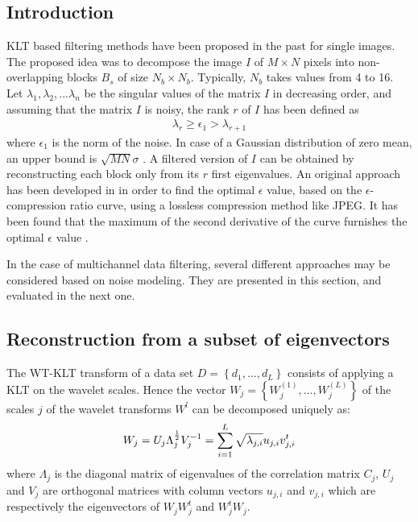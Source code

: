\subsection{Introduction}
KLT based filtering methods have been proposed 
in the past \cite{mc:andrews76,mc:lee91,mc:constant97} for single images.
The proposed idea was to decompose the image $I$ of $M \times N$ pixels
into non-overlapping blocks $B_s$ of size $N_b \times N_b$. Typically, $N_b$ takes
values from 4 to 16. Let $\lambda_1,\lambda_2,...\lambda_n$ be the 
singular values of the matrix $I$ in decreasing order, and
assuming that the matrix $I$ is noisy, the rank $r$ of $I$ 
has been defined as \cite{mc:constant88}
\begin{eqnarray}
\lambda_r \ge \epsilon_1 > \lambda_{r+1}
\end{eqnarray}
where $\epsilon_1$ is the norm of the noise. In case of 
a Gaussian distribution of zero mean, an upper bound is $\sqrt{MN}\sigma$
\cite{mc:constant97}.
A filtered version of $I$ can be obtained by reconstructing each block
only from its $r$ first eigenvalues.
An original approach has been developed in \cite{mc:natarajan95,mc:constant97}
in order to find the optimal
$\epsilon$ value, based on the $\epsilon$-compression ratio curve, using 
a lossless compression method like JPEG. It has been found that the maximum 
of the second derivative of the curve furnishes the 
optimal $\epsilon$ value \cite{mc:natarajan95}.

In the case of multichannel data filtering, several different approaches 
may be considered based on noise modeling. They are 
presented in this section, and evaluated in the next one.

\subsection{Reconstruction from a subset of eigenvectors}
The WT-KLT transform of a data set $D=\left\{d_1, ..., d_L\right\}$
consists of applying a KLT on the wavelet scales. Hence the vector
$W_j = \left\{ W_j^{(1)}, ..., W_j^{(L)}\right\}$ of the scales 
$j$ of the wavelet
transforms $W^{l}$ can be decomposed uniquely as:
\begin{eqnarray}
 W_j = U_j \Lambda_j^{1 \over 2}  V_j^{-1} = \sum_{i=1}^L 
 \sqrt{\lambda_{j,i}}  {u}_{j,i} 
 {v}_{j,i}^t
\end{eqnarray}
where $\Lambda_j$ is the diagonal matrix of eigenvalues of the correlation
matrix $C_j$,  $U_j$ and $V_j$ are orthogonal matrices with column vectors
$u_{j,i}$ and $v_{j,i}$ which are respectively 
 the eigenvectors of $W_j W_j^t$ and $W_j^t W_j$.

